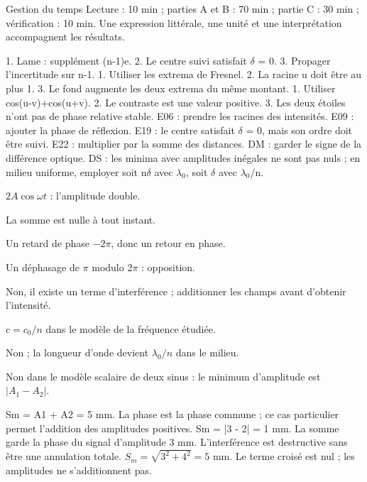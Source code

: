 \begin{docu}{Gestion du temps}
Lecture : 10 min ; parties A et B : 70 min ; partie C : 30 min ; vérification : 10 min. Une expression littérale, une unité et une interprétation accompagnent les résultats.
\end{docu}


1. Lame : supplément (n-1)e. 2. Le centre suivi satisfait \ensuremath{\delta} = 0. 3. Propager l’incertitude sur n-1.
1. Utiliser les extrema de Fresnel. 2. La racine u doit être au plus 1. 3. Le fond augmente les deux extrema du même montant.
1. Utiliser cos(u-v)+cos(u+v). 2. Le contraste est une valeur positive. 3. Les deux étoiles n’ont pas de phase relative stable.
E06 : prendre les racines des intensités. E09 : ajouter la phase de réflexion. E19 : le centre satisfait \ensuremath{\delta} = 0, mais son ordre doit être suivi. E22 : multiplier par la somme des distances.
DM : garder le signe de la différence optique. DS : les minima avec amplitudes inégales ne sont pas nuls ; en milieu uniforme, employer soit n\ensuremath{\delta} avec \ensuremath{\lambda_0}, soit \ensuremath{\delta} avec \ensuremath{\lambda_0}/n.


$2A\cos\omega t$ : l’amplitude double.

La somme est nulle à tout instant.

Un retard de phase $-2\pi$, donc un retour en phase.

Un déphasage de \ensuremath{\pi} modulo 2\ensuremath{\pi} : opposition.

Non, il existe un terme d’interférence ; additionner les champs avant d’obtenir l’intensité.

$c=c_0/n$ dans le modèle de la fréquence étudiée.

Non ; la longueur d’onde devient $\lambda_0/n$ dans le milieu.

Non dans le modèle scalaire de deux sinus : le minimum d’amplitude est $|A_1-A_2|$.


Sm = A1 + A2 = 5 mm. La phase est la phase commune ; ce cas particulier permet l’addition des amplitudes positives.
Sm = |3 - 2| = 1 mm. La somme garde la phase du signal d’amplitude 3 mm. L’interférence est destructive sans être une annulation totale.
$S_m=\sqrt{3^2+4^2}=5$ mm. Le terme croisé est nul ; les amplitudes ne s’additionnent pas.


